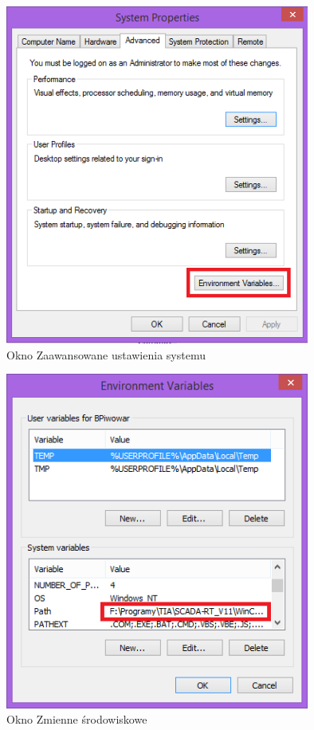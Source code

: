 \begin{figure}[h]
\centering
\includegraphics[width=10cm]{Zdjecia/5/anaconda4}
\caption{Okno Zaawansowane ustawienia systemu}
\label{fig:anaconda4}
\end{figure}

\begin{figure}[h]
\centering
\includegraphics[width=10cm]{Zdjecia/5/anaconda5}
\caption{Okno Zmienne środowiskowe}
\label{fig:anaconda5}
\end{figure}

